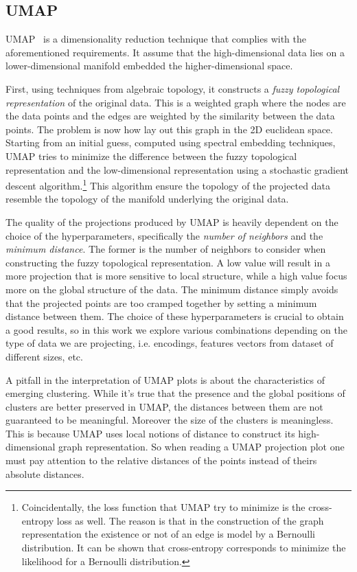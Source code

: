 \subsection{UMAP}
\label{subsec:projections-umap}

UMAP~\cite{UmapUniformMMcinne2018} is a dimensionality reduction technique that complies with the aforementioned requirements. It assume that the high-dimensional data lies on a lower-dimensional manifold embedded the higher-dimensional space.

First, using techniques from algebraic topology, it constructs a \emph{fuzzy topological representation} of the original data. This is a weighted graph where the nodes are the data points and the edges are weighted by the similarity between the data points.
The problem is now how lay out this graph in the 2D euclidean space. Starting from an initial guess, computed using spectral embedding techniques, UMAP tries to minimize the difference between the fuzzy topological representation and the low-dimensional representation using a stochastic gradient descent algorithm.\footnote{Coincidentally, the loss function that UMAP try to minimize is the cross-entropy loss as well. The reason is that in the construction of the graph representation the existence or not of an edge is model by a Bernoulli distribution. It can be shown that cross-entropy corresponds to minimize the likelihood for a Bernoulli distribution.} This algorithm ensure the topology of the projected data resemble the topology of the manifold underlying the original data.

The quality of the projections produced by UMAP is heavily dependent on the choice of the hyperparameters, specifically the \emph{number of neighbors} and the \emph{minimum distance}. The former is the number of neighbors to consider when constructing the fuzzy topological representation. A low value will result in a more projection that is more sensitive to local structure, while a high value focus more on the global structure of the data. The minimum distance simply avoids that the projected points are too cramped together by setting a minimum distance between them. The choice of these hyperparameters is crucial to obtain a good results, so in this work we explore various combinations depending on the type of data we are projecting, i.e. encodings, features vectors from dataset of different sizes, etc.

A pitfall in the interpretation of UMAP plots is about the characteristics of emerging clustering.  While it's true that the presence and the global positions of clusters are better preserved in UMAP, the distances between them are not guaranteed to be meaningful. Moreover the size of the clusters is meaningless. This is because UMAP uses local notions of distance to construct its high-dimensional graph representation. So when reading a UMAP projection plot one must pay attention to the relative distances of the points instead of theirs absolute distances.


